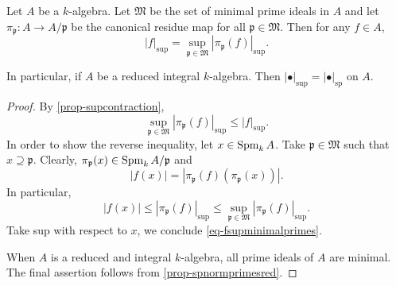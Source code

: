 \begin{proposition}\label{prop-supeqsp}
    Let $A$ be a $k$-algebra. Let $\mathfrak{M}$ be the set of minimal prime ideals in $A$ and let $\pi_{\mathfrak{p}}:A\rightarrow A/\mathfrak{p}$ be the canonical residue map for all $\mathfrak{p}\in \mathfrak{M}$. Then for any $f\in A$,
    \begin{equation}\label{eq-fsupminimalprimes}
        |f|_{\sup}=\sup_{\mathfrak{p}\in \mathfrak{M}} |\pi_{\mathfrak{p}}(f)|_{\sup}.
    \end{equation}

    In particular, if $A$ be a reduced integral $k$-algebra. Then $|\bullet|_{\sup}=|\bullet|_{\mathrm{sp}}$ on $A$.
\end{proposition}
\begin{proof}
    By \cref{prop-supcontraction}, 
    \[
        \sup_{\mathfrak{p}\in \mathfrak{M}} |\pi_{\mathfrak{p}}(f)|_{\sup}\leq |f|_{\sup}.  
    \]
    In order to show the reverse inequality, let $x\in \operatorname{Spm}_k A$. Take $\mathfrak{p}\in \mathfrak{M}$ such that $x\supseteq \mathfrak{p}$. Clearly, $\pi_{\mathfrak{p}}(x)\in \operatorname{Spm}_k A/\mathfrak{p}$ and
    \[
        |f(x)|=\left|\pi_{\mathfrak{p}}(f)(\pi_{\mathfrak{p}}(x))\right|.  
    \]
    In particular,
    \[
        |f(x)|\leq |\pi_{\mathfrak{p}}(f)|_{\sup}\leq \sup_{\mathfrak{p}\in \mathfrak{M}}   |\pi_{\mathfrak{p}}(f)|_{\sup}.
    \]
    Take sup with respect to $x$, we conclude \eqref{eq-fsupminimalprimes}.

    When $A$ is a reduced and integral $k$-algebra, all prime ideals of $A$ are minimal. The final assertion follows from \cref{prop-spnormprimesred}.
\end{proof}

